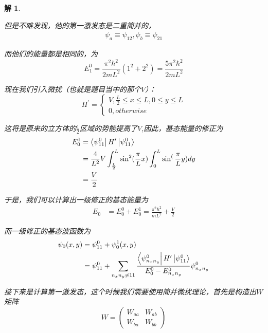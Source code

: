 \documentclass{article}
\newtheorem{solution}{解}
\begin{document}
\begin{solution}
\begin{enumerate}
        但是不难发现，他的第一激发态是二重简并的，
        \begin{align*}
            \psi_a\equiv\psi_{12},\psi_b\equiv\psi_{21}
        \end{align*}

        而他们的能量都是相同的，为
        \begin{equation*}
            E_1^0=\frac{\pi^2\hbar^2}{2mL^2}(1^2+2^2)=\frac{5\pi^2\hbar^2}{2mL^2}
        \end{equation*}

        现在我们引入微扰（也就是题目当中的那个$V$）：
        \begin{equation*}
            H^\prime=
            \begin{cases}
                V,\frac{L}{2}\leq x \leq L,0\leq y\leq L\\
                0,otherwise    
            \end{cases}
        \end{equation*}

        这将是原来的立方体的$\displaystyle\frac{1}{2}$区域的势能提高了$V$,因此，基态能量的修正为
        \begin{align*}
            E_0^1&=\bra{\psi_{11}^0}H^\prime\ket{\psi_{11}^0}\\
            &=\frac{4}{L^2}V\int_{\frac{L}{2}}^{L}\sin^2(\frac{\pi}{L}x)\int_{0}^{L}\sin^(\frac{\pi}{L}y)dy\\
            &=\frac{V}{2}
        \end{align*}

        于是，我们可以计算出一级修正的基态能量为
        \begin{align*}
            E_0&=E_0^0+E_0^1=\frac{\pi^2\hbar^2}{mL^2}+\frac{V}{2}
        \end{align*}

        而一级修正的基态波函数为
        \begin{align*}
            \psi_0(x,y)&=\psi_{11}^0+\psi_0^1(x,y)\\
            &=\psi_{11}^0+\sum_{n_xn_y\neq 11}\frac{\bra{\psi_{n_xn_y}^0}H^\prime\ket{\psi_{11}^0}}{E_0^0-E_{n_xn_y}^0}\psi_{n_xn_y}^0
        \end{align*}

        接下来是计算第一激发态，这个时候我们需要使用简并微扰理论，首先是构造出$W$矩阵
        \begin{equation*}
            W=
            \begin{pmatrix}
                W_{aa} & W_{ab}\\
                W_{ba} & W_{bb}
            \end{pmatrix}
        \end{equation*}


\end{enumerate}
\end{solution}
\end{document}
